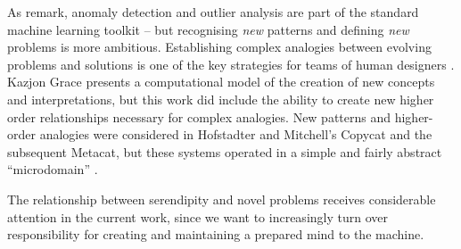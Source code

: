 As \cite[p. 69]{pease2013discussion} remark, anomaly detection and
outlier analysis are part of the standard machine learning toolkit --
but recognising \emph{new} patterns and defining \emph{new} problems
is more ambitious.  Establishing complex analogies between evolving problems and
solutions is one of the key strategies for teams of human designers
\cite{Analogical-problem-evolution-DCC}.  Kazjon Grace
\citeyear{kaz-thesis} presents a computational model of the creation
of new concepts and interpretations, but this work did include the
ability to create new higher order relationships necessary for complex
analogies.  New patterns and higher-order analogies were considered in
Hofstadter and Mitchell's {\sf Copycat} and the subsequent {\sf
  Metacat}, but these systems operated in a simple and fairly abstract
``microdomain''
\cite{hofstadter1994copycat,DBLP:journals/jetai/Marshall06}.  %

The relationship between serendipity and novel problems receives
considerable attention in the current work, since we want to
increasingly turn over responsibility for creating and maintaining a
prepared mind to the machine.
